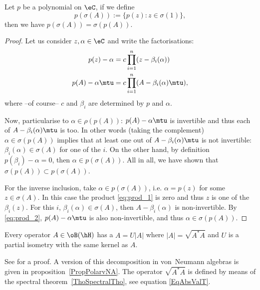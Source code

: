 \begin{lemma}
Let $p$ be a polynomial on $\eC$, if we define
\[
   p(\sigma(A)):=\{ p(z):z\in\sigma(1) \},
\]
then we have $p(\sigma(A))=\sigma(p(A))$. \label{lem:sigma_poly}
\end{lemma}

\begin{proof}
	Let us consider $z,\alpha\in\eC$ and write the factorisations:
	\begin{subequations}
	\begin{align}
	  p(z)-\alpha&=c\prod_{i=1}^{n}(z-\beta_i(\alpha))\label{eq:prod_1}\\
	  p(A)-\alpha\mtu&=c\prod_{i=1}^{n}(A-\beta_i(\alpha)\mtu)\label{eq:prod_2},
	\end{align}
	\end{subequations}
	where --of course-- $c$ and $\beta_i$ are determined by $p$ and $\alpha$.

	Now, particularise to $\alpha\in\rho(p(A))$: $p(A)-\alpha\mtu$ is invertible and thus each of $A-\beta_i(\alpha)\mtu$ is too. In other words (taking the complement) $\alpha\in\sigma(p(A))$ implies that at least one out of $A-\beta_i(\alpha)\mtu$ is not invertible: $\beta_i(\alpha)\in\sigma(A)$ for one of the $i$. On the other hand, by definition $p(\beta_i)-\alpha=0$, then $\alpha\in p(\sigma(A))$. All in all, we have shown that $\sigma(p(A))\subset p(\sigma(A))$.

	For the inverse inclusion, take $\alpha\in p(\sigma(A))$, i.e. $\alpha=p(z)$ for some $z\in\sigma(A)$. In this case the product \eqref{eq:prod_1} is zero and thus $z$ is one of the $\beta_i(z)$. For this $i$, $\beta_i(\alpha)\in\sigma(A)$, then $A-\beta_i(\alpha)$ is non-invertible. By \eqref{eq:prod_2}, $p(A)-\alpha\mtu$ is also non-invertible, and thus $\alpha\in\sigma(p(A))$.

\end{proof}

\begin{lemma}		\label{LemPolarHilbert}
	Every operator $A\in \oB(\hH)$ has a  $A=U| A |$ where $| A |=\sqrt{A^*A}$ and $U$ is a partial isometry with the same kernel as $A$.
\end{lemma}

See \cite{Landsman} for a proof. A version of this decomposition in von~Neumann algebras is given in proposition~\ref{PropPolarvNA}. The operator $\sqrt{A^*A}$ is defined by means of the spectral theorem~\ref{ThoSpectralTho}, see equation \eqref{EqAbsValT}.

